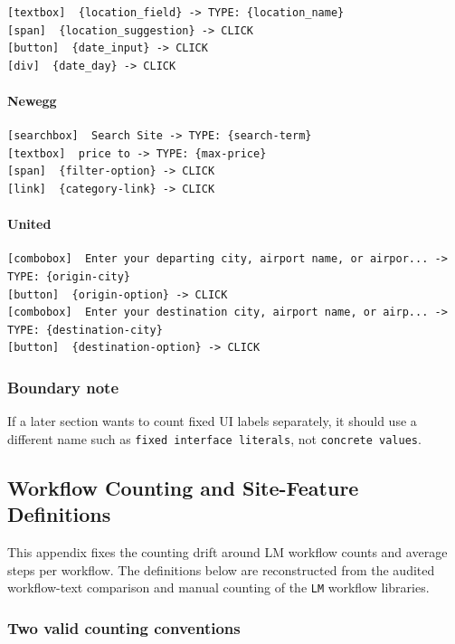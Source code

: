 \begin{verbatim}
[textbox]  {location_field} -> TYPE: {location_name}
[span]  {location_suggestion} -> CLICK
[button]  {date_input} -> CLICK
[div]  {date_day} -> CLICK
\end{verbatim}

\paragraph{Newegg}

\begin{verbatim}
[searchbox]  Search Site -> TYPE: {search-term}
[textbox]  price to -> TYPE: {max-price}
[span]  {filter-option} -> CLICK
[link]  {category-link} -> CLICK
\end{verbatim}

\paragraph{United}

\begin{verbatim}
[combobox]  Enter your departing city, airport name, or airpor... -> TYPE: {origin-city}
[button]  {origin-option} -> CLICK
[combobox]  Enter your destination city, airport name, or airp... -> TYPE: {destination-city}
[button]  {destination-option} -> CLICK
\end{verbatim}

\subsubsection{Boundary note}

If a later section wants to count fixed UI labels separately, it should
use a different name such as \texttt{fixed\ interface\ literals}, not
\texttt{concrete\ values}.


\clearpage
\subsection{Workflow Counting and Site-Feature Definitions}\label{app:C3}

This appendix fixes the counting drift around LM workflow counts and
average steps per workflow. The definitions below are reconstructed
from the audited workflow-text comparison and manual counting of the
\texttt{LM} workflow libraries.

\subsubsection{Two valid counting
conventions}

